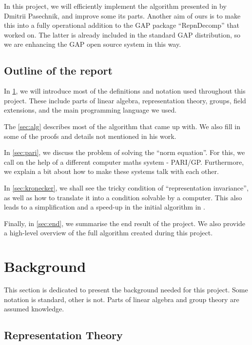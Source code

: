 \documentclass[11pt]{article}
\begin{document}
In this project, we will efficiently implement the algorithm presented
in \cite{Pas21} by Dmitrii Pasechnik, and improve some its parts. Another aim of
ours is to make this into a fully operational addition to the GAP package
``RepnDecomp'' that \cite{Hymabaccus2020} worked on. The latter is already
included in the standard GAP distribution, so we are enhancing the GAP open
source system in this way.

\subsection{Outline of the report}
In \cref{sec:bg}, we will introduce most of the definitions and notation used
throughout this project. These include parts of linear algebra, representation
theory, groups, field extensions, and the main programming language we used.

The \cref{sec:alg} describes most of the algorithm that \cite{Pas21} came up
with. We also fill in some of the proofs and details not mentioned in his work.

In \cref{sec:pari}, we discuss the problem of solving the ``norm equation''. For
this, we call on the help of a different computer maths system - PARI/GP.
Furthermore, we explain a bit about how to make these systems talk with each other.

In \cref{sec:kronecker}, we shall see the tricky condition of ``representation
invariance'', as well as how to translate it into a condition solvable by a
computer. This also leads to a simplification and a speed-up
in the initial algorithm in \cite{Pas21}.

Finally, in \cref{sec:end}, we summarise the end result of the project. We also
provide a high-level overview of the full algorithm created during this project.

\newpage

\section{Background} \label{sec:bg}

This section is dedicated to present the background needed for
this project. Some notation is standard, other is not. Parts of linear algebra
and group theory are assumed knowledge.

\subsection{Representation Theory}
\end{document}
